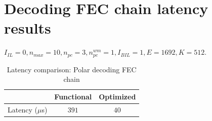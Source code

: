 \section{Decoding FEC chain latency results}

$I_{IL} = 0, n_{max} = 10, n_{pc} = 3 ,n_{pc}^{wm} = 1, I_{BIL} = 1, E = 1692, K = 512$.
\begin{table}[!h]
	\begin{center}
		\caption{Latency comparison: Polar decoding FEC chain}
		\label{tab:decodingFECChainLatency}
		\begin{tabular}{c|c|c} %
			\textbf{ } & Functional & Optimized \\
			\hline
			Latency ($\mu$s) & $391$ & $40$\\
		\end{tabular}
	\end{center}
\end{table}
